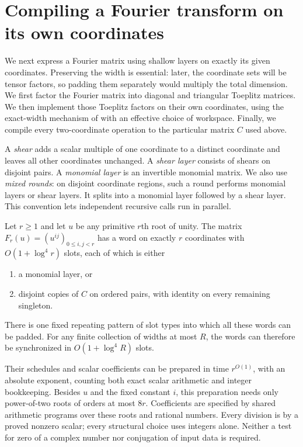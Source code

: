 \section{Compiling a Fourier transform on its own coordinates}
\label{loc:section}
\label{sec:local}

We next express a Fourier matrix using shallow layers on exactly its
given coordinates.  Preserving the width is essential: later, the
coordinate sets will be tensor factors, so padding them separately would
multiply the total dimension.  We first factor the Fourier matrix into
diagonal and triangular Toeplitz matrices.  We then implement those Toeplitz factors on their
own coordinates, using the exact-width mechanism of
\cite[Section~3]{exactfourier} with an effective choice of workspace.
Finally, we compile every two-coordinate operation to the particular
matrix $C$ used above.

A \emph{shear} adds a scalar multiple of one coordinate to a distinct
coordinate and leaves all other coordinates unchanged.  A \emph{shear
layer} consists of shears on disjoint pairs.  A \emph{monomial layer} is
an invertible monomial matrix.  We also use \emph{mixed rounds}: on
disjoint coordinate regions, such a round performs monomial layers or
shear layers.  It splits into a monomial layer followed by a shear
layer.  This convention lets independent recursive calls run in parallel.

\begin{proposition}\label{loc:compiler}
Let $r\ge1$ and let $u$ be any primitive $r$th root of unity.  The matrix
$F_r(u)=(u^{ij})_{0\le i,j<r}$ has a word on exactly $r$ coordinates
with $O(1+\log^4r)$ slots, each of which is either
\begin{enumerate}
\item a monomial layer, or
\item disjoint copies of $C$ on ordered pairs, with identity on every
remaining singleton.
\end{enumerate}
There is one fixed repeating pattern of slot types into which all these
words can be padded.  For any finite collection of widths at most $R$, the words
can therefore be synchronized in $O(1+\log^4R)$ slots.

Their schedules and scalar coefficients can be prepared in time
$r^{O(1)}$, with an absolute exponent, counting both exact scalar
arithmetic and integer bookkeeping.  Besides $u$ and the fixed constant
$i$, this preparation needs only power-of-two roots of orders at most
$8r$.  Coefficients are specified by shared arithmetic programs over
these roots and rational numbers.  Every division is by a proved
nonzero scalar; every structural choice uses integers alone.  Neither
a test for zero of a complex number nor conjugation of input data is
required.
\end{proposition}

